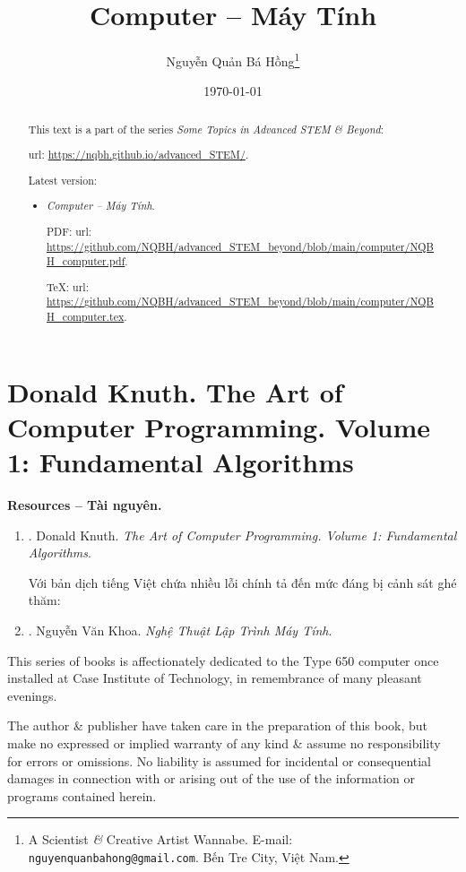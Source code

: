 \documentclass{article}
\title{Computer -- Máy Tính}
\author{Nguyễn Quản Bá Hồng\footnote{A Scientist {\it\&} Creative Artist Wannabe. E-mail: {\tt nguyenquanbahong@gmail.com}. Bến Tre City, Việt Nam.}}
\date{\today}
\begin{document}
\maketitle
\begin{abstract}
	This text is a part of the series {\it Some Topics in Advanced STEM \& Beyond}:
	
	{\sc url}: \url{https://nqbh.github.io/advanced_STEM/}.
	
	Latest version:
	\begin{itemize}
		\item {\it Computer -- Máy Tính}.
		
		PDF: {\sc url}: \url{https://github.com/NQBH/advanced_STEM_beyond/blob/main/computer/NQBH_computer.pdf}.
		
		\TeX: {\sc url}: \url{https://github.com/NQBH/advanced_STEM_beyond/blob/main/computer/NQBH_computer.tex}.
	\end{itemize}
\end{abstract}
\tableofcontents


\section{{\sc Donald Knuth}. The Art of Computer Programming. Volume 1: Fundamental Algorithms}
\textbf{\textsf{Resources -- Tài nguyên.}}
\begin{enumerate}
	\item \cite{Knuth1997}. {\sc Donald Knuth}. {\it The Art of Computer Programming. Volume 1: Fundamental Algorithms}.
	
	Với bản dịch tiếng Việt chứa nhiều lỗi chính tả đến mức đáng bị cảnh sát ghé thăm:
	\item \cite{Khoa_art_programming}. {\sc Nguyễn Văn Khoa}. {\it Nghệ Thuật Lập Trình Máy Tính}.
\end{enumerate}
This series of books is affectionately dedicated to the Type 650 computer once installed at Case Institute of Technology, in remembrance of many pleasant evenings.

The author \& publisher have taken care in the preparation of this book, but make no expressed or implied warranty of any kind \& assume no responsibility for errors or omissions. No liability is assumed for incidental or consequential damages in connection with or arising out of the use of the information or programs contained herein.
\end{document}
